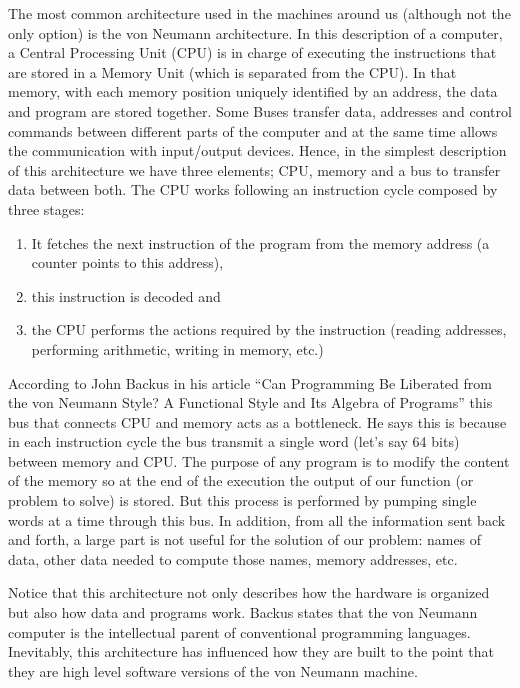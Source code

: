 The most common architecture used in the machines around us (although not the only option) is the von Neumann architecture. 
In this description of a computer, a Central Processing Unit (CPU) is in charge of executing the instructions that are stored in a Memory Unit (which is separated from the CPU). 
In that memory, with each memory position uniquely identified by an address, the data and program are stored together. 
Some Buses transfer data, addresses and control commands between different parts of the computer
and at the same time allows the communication with input/output devices.
Hence, in the simplest description of this architecture we have three elements; CPU, memory and a bus to transfer data between both. 
The CPU works following an instruction cycle composed by three stages:
\begin{enumerate}[label=(\roman*)]
    \item It fetches the next instruction of the program from the memory address (a counter points to this address),
    \item this instruction is decoded and 
    \item the CPU performs the actions required by the instruction (reading addresses, performing arithmetic, writing in memory, etc.)
\end{enumerate} 

According to John Backus in his article ``Can Programming Be Liberated from the von Neumann Style? A Functional Style and Its Algebra of Programs'' 
this bus that connects CPU and memory acts as a bottleneck. 
He says this is because in each instruction cycle the bus transmit a single word (let's say 64 bits) between memory and CPU.
The purpose of any program is to modify the content of the memory so at the end of the execution the output of our function (or problem to solve) is stored.
But this process is performed by pumping single words at a time through this bus.
In addition, from all the information sent back and forth, a large part is not useful for the solution of our problem: names of data, other data needed to compute those names, memory addresses, etc. 

Notice that this architecture not only describes how the hardware is organized but also how data and programs work.
Backus states that the von Neumann computer is the intellectual parent of conventional programming languages. 
Inevitably, this architecture has influenced how they are built to the point that 
they are high level software versions of the von Neumann machine. 

